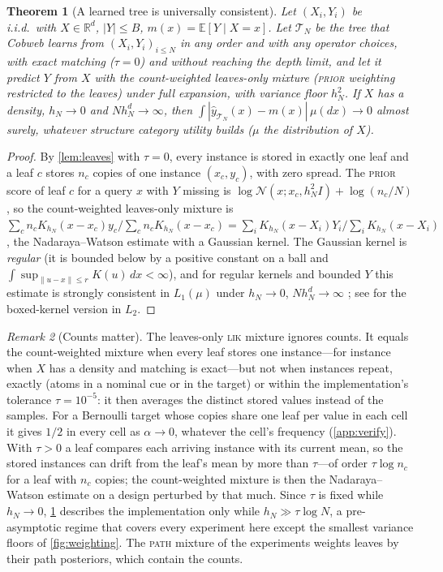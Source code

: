 \documentclass[11pt]{article}
\newtheorem{theorem}{Theorem}
\theoremstyle{definition}
\theoremstyle{remark}
\newtheorem{remark}[theorem]{Remark}
\newcommand{\R}{\mathbb{R}}
\newcommand{\E}{\mathbb{E}}
\newcommand{\N}{\mathcal{N}}
\newcommand{\T}{\mathcal{T}}
\newcommand{\hy}{\hat{y}}
\begin{document}
\begin{theorem}[A learned tree is universally consistent]\label{thm:consistency}
Let $(X_i,Y_i)$ be i.i.d.\ with $X\in\R^d$, $|Y|\le B$, $m(x)=\E[Y\mid X=x]$.
Let $\T_N$ be the tree that Cobweb learns from $(X_i,Y_i)_{i\le N}$ in any order and with
any operator choices, with exact matching ($\tau=0$) and without reaching the depth
limit, and let it predict $Y$ from $X$ with the \emph{count-weighted} leaves-only mixture
(\textsc{prior} weighting restricted to the leaves) under full expansion, with variance
floor $h_N^2$.  If $X$ has a density, $h_N\to0$ and $Nh_N^d\to\infty$, then
$\int|\hy_{\T_N}(x)-m(x)|\,\mu(dx)\to0$ almost surely, whatever structure category
utility builds ($\mu$ the distribution of $X$).
\end{theorem}
\begin{proof}
By \cref{lem:leaves} with $\tau=0$, every instance is stored in exactly one leaf and a
leaf $c$ stores $n_c$ copies of one instance $(x_c,y_c)$, with zero spread.  The
\textsc{prior} score of leaf $c$ for a query $x$ with $Y$ missing is
$\log\N(x;x_c,h_N^2I)+\log(n_c/N)$, so the count-weighted leaves-only mixture is
$\sum_cn_cK_{h_N}(x-x_c)y_c/\sum_cn_cK_{h_N}(x-x_c)=\sum_iK_{h_N}(x-X_i)Y_i/\sum_iK_{h_N}(x-X_i)$,
the Nadaraya--Watson estimate with a Gaussian kernel.  The Gaussian kernel is \emph{regular} (it is bounded below by a
positive constant on a ball and $\int\sup_{\|u-x\|\le r}K(u)\,dx<\infty$), and for
regular kernels and bounded $Y$ this estimate is strongly consistent in $L_1(\mu)$
under $h_N\to0$, $Nh_N^d\to\infty$ \citep{devroye1989}; see \citet[Ch.~5]{gyorfi2002}
for the boxed-kernel version in $L_2$.
\end{proof}

\begin{remark}[Counts matter]\label{rem:counts}
The leaves-only \textsc{lik} mixture ignores counts.  It equals the count-weighted mixture
when every leaf stores one instance---for instance when $X$ has a density and matching is
exact---but not when instances repeat, exactly (atoms in a nominal cue or in the target)
or within the implementation's tolerance $\tau=10^{-5}$: it then averages the distinct
stored values instead of the samples.  For a Bernoulli target whose copies share one leaf
per value in each cell it gives $1/2$ in every cell as $\alpha\to0$, whatever the cell's
frequency (\cref{app:verify}).  With $\tau>0$ a leaf compares each arriving instance with its current
mean, so the stored instances can drift from the leaf's mean by more than $\tau$---of order
$\tau\log n_c$ for a leaf with $n_c$ copies; the count-weighted mixture is then the
Nadaraya--Watson estimate on a design perturbed by that much.  Since $\tau$ is fixed while
$h_N\to0$, \cref{thm:consistency} describes the implementation only while
$h_N\gg\tau\log N$, a pre-asymptotic regime that covers every experiment here except the
smallest variance floors of \cref{fig:weighting}.  The
\textsc{path} mixture of the experiments weights leaves by their path posteriors, which
contain the counts.
\end{remark}
\end{document}

